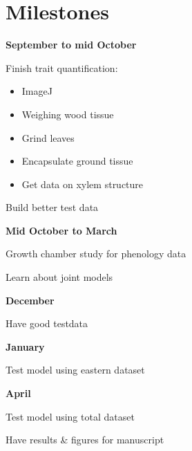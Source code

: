 \documentclass{article}\usepackage[]{graphicx}\usepackage[]{color}
\begin{document}
\section*{Milestones}

\textbf{September to mid October}
\par Finish trait quantification:
\begin{itemize}
\item ImageJ
\item Weighing wood tissue
\item Grind leaves
\item Encapsulate ground tissue
\item Get data on xylem structure 
\end{itemize}
\par Build better test data

\textbf{Mid October to March}
\par Growth chamber study for phenology data
\par Learn about joint models

\textbf{December}
\par Have good testdata

\textbf{January}
\par Test model using eastern dataset

\textbf{April}
\par Test model using total dataset

\par Have results & figures for manuscript

% 


\end{document}
